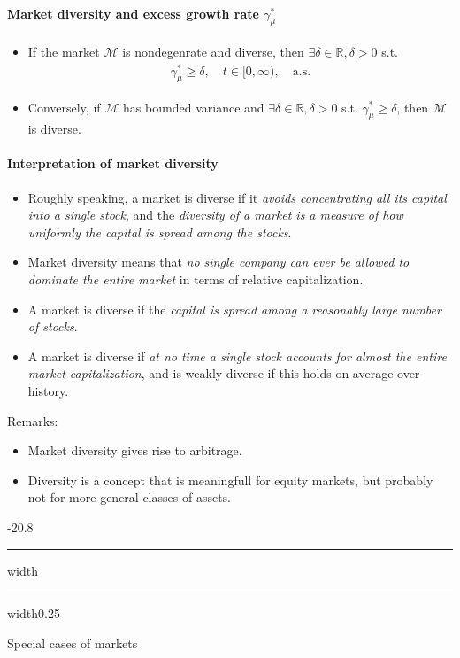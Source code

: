 \documentclass[a4paper,landscape,8pt,fleqn]{scrartcl}
\makeatletter
\renewcommand{\subsection}{\@startsection{subsection}{1}{0mm}%
{-2\baselineskip}{0.8\baselineskip}%
{\hrule depth 0.2pt width\columnwidth\hrule depth0.75pt
width0.25\columnwidth\vspace*{1.2em}\large\bfseries}}
\makeatother
\begin{document}
\begin{multicols*}{3}
\paragraph{Market diversity and excess growth rate $\gamma_\mu^\ast$}

\begin{itemize}
\item If the market $\mathcal{M}$ is nondegenrate and diverse, then $\exists \delta \in \mathbb{R}, \delta > 0$ s.t.
\begin{align*}
\gamma_\mu^\ast \geq \delta, \quad t \in [0,\infty), \quad \text{a.s.}
\end{align*}
\item Conversely, if $\mathcal{M}$ has bounded variance and $\exists \delta \in \mathbb{R}, \delta > 0$ s.t. $\gamma_\mu^\ast \geq \delta$, then $\mathcal{M}$ is diverse.
\end{itemize}

\paragraph{Interpretation of market diversity}

\begin{itemize}
\item Roughly speaking, a market is diverse if it \textit{avoids concentrating all its capital into a single stock}, and the \textit{diversity of a market is a measure of how uniformly the capital is spread among the stocks}.
\item Market diversity means that \textit{no single company can ever be allowed to dominate the entire market} in terms of relative capitalization.
\item A market is diverse if the \textit{capital is spread among a reasonably large number of stocks}.
\item A market is diverse if \textit{at no time a single stock accounts for almost the entire market capitalization}, and is weakly diverse if this holds on average over history.
\end{itemize}

Remarks:
\begin{itemize}
\item Market diversity gives rise to arbitrage.
\item Diversity is a concept that is meaningfull for equity markets, but probably not for more general classes of assets.
\end{itemize}

\subsection{Special cases of markets}


\end{multicols*}
\end{document}
